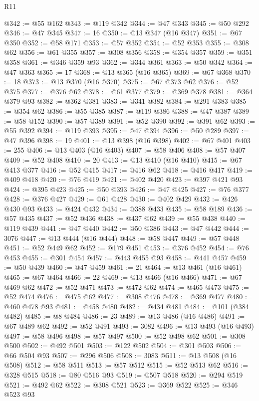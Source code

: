 \begin{lexlean}{R11}
\begin{coremodule}
@342 := @55 @162
@343 := @119 @342
@344 := @47 @343
@345 := @50 @292
@346 := @47 @345
@347 := 16
@350 := @13 @347 (@16 @347)
@351 := @67 @350
@352 := @58 @171
@353 := @57 @352
@354 := @52 @353
@355 := @308 @62
@356 := @61 @355
@357 := @308 @356
@358 := @354 @357
@359 := @351 @358
@361 := @346 @359 @93
@362 := @344 @361
@363 := @50 @342
@364 := @47 @363
@365 := 17
@368 := @13 @365 (@16 @365)
@369 := @67 @368
@370 := 18
@373 := @13 @370 (@16 @370)
@375 := @67 @373 @62
@376 := @52 @375
@377 := @376 @62
@378 := @61 @377
@379 := @369 @378
@381 := @364 @379 @93
@382 := @362 @381
@383 := @341 @382
@384 := @291 @383
@385 := @354 @62
@386 := @55 @385
@387 := @119 @386
@388 := @47 @387
@389 := @58 @152
@390 := @57 @389
@391 := @52 @390
@392 := @391 @62
@393 := @55 @392
@394 := @119 @393
@395 := @47 @394
@396 := @50 @289
@397 := @47 @396
@398 := 19
@401 := @13 @398 (@16 @398)
@402 := @67 @401
@403 := 255
@406 := @13 @403 (@16 @403)
@407 := @58 @406
@408 := @57 @407
@409 := @52 @408
@410 := 20
@413 := @13 @410 (@16 @410)
@415 := @67 @413 @377
@416 := @52 @415
@417 := @416 @62
@418 := @416 @417
@419 := @409 @418
@420 := @76 @419
@421 := @402 @420
@423 := @397 @421 @93
@424 := @395 @423
@425 := @50 @393
@426 := @47 @425
@427 := @76 @377
@428 := @376 @427
@429 := @61 @428
@430 := @402 @429
@432 := @426 @430 @93
@433 := @424 @432
@434 := @388 @433
@435 := @58 @189
@436 := @57 @435
@437 := @52 @436
@438 := @437 @62
@439 := @55 @438
@440 := @119 @439
@441 := @47 @440
@442 := @50 @386
@443 := @47 @442
@444 := 3076
@447 := @13 @444 (@16 @444)
@448 := @58 @447
@449 := @57 @448
@451 := @52 @449 @62
@452 := @179 @451
@453 := @376 @452
@454 := @76 @453
@455 := @301 @454
@457 := @443 @455 @93
@458 := @441 @457
@459 := @50 @439
@460 := @47 @459
@461 := 21
@464 := @13 @461 (@16 @461)
@465 := @67 @464
@466 := 22
@469 := @13 @466 (@16 @466)
@471 := @67 @469 @62
@472 := @52 @471
@473 := @472 @62
@474 := @465 @473
@475 := @52 @474
@476 := @475 @62
@477 := @308 @476
@478 := @369 @477
@480 := @460 @478 @93
@481 := @458 @480
@482 := @434 @481
@484 := @101 (@384 @482)
@485 := @8 @484
@486 := 23
@489 := @13 @486 (@16 @486)
@491 := @67 @489 @62
@492 := @52 @491
@493 := 3082
@496 := @13 @493 (@16 @493)
@497 := @58 @496
@498 := @57 @497
@500 := @52 @498 @62
@501 := @308 @500
@502 := @492 @501
@503 := @122 @502
@504 := @301 @503
@506 := @66 @504 @93
@507 := @296 @506
@508 := 3083
@511 := @13 @508 (@16 @508)
@512 := @58 @511
@513 := @57 @512
@515 := @52 @513 @62
@516 := @328 @515
@518 := @80 @516 @93
@519 := @507 @518
@520 := @294 @519
@521 := @492 @62
@522 := @308 @521
@523 := @369 @522
@525 := @346 @523 @93

\end{coremodule}
\end{lexlean}
